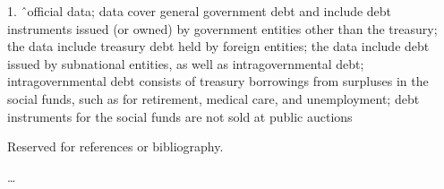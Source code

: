 \documentclass[openany]{book}
\begin{document}
1. \^\ official data; data cover general government debt and include debt instruments issued (or owned) by government entities other than the treasury; the data include treasury debt held by foreign entities; the data include debt issued by subnational entities, as well as intragovernmental debt; intragovernmental debt consists of treasury borrowings from surpluses in the social funds, such as for retirement, medical care, and unemployment; debt instruments for the social funds are not sold at public auctions

\backmatter
Reserved for references or bibliography.

    


\dots
\end{document}
